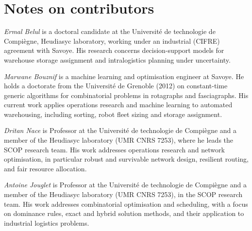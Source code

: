 \documentclass[]{interact}
\begin{document}
\section*{Notes on contributors}
\noindent\textit{Ermal Belul} is a doctoral candidate at the Universit\'{e} de technologie de Compi\`{e}gne, Heudiasyc laboratory, working under an industrial (CIFRE) agreement with Savoye. His research concerns decision-support models for warehouse storage assignment and intralogistics planning under uncertainty.

\medskip
\noindent\textit{Marwane Bouznif} is a machine learning and optimisation engineer at Savoye. He holds a doctorate from the Universit\'{e} de Grenoble (2012) on constant-time generic algorithms for combinatorial problems in rotagraphs and fasciagraphs. His current work applies operations research and machine learning to automated warehousing, including sorting, robot fleet sizing and storage assignment.

\medskip
\noindent\textit{Dritan Nace} is Professor at the Universit\'{e} de technologie de Compi\`{e}gne and a member of the Heudiasyc laboratory (UMR CNRS 7253), where he leads the SCOP research team. His work addresses operations research and network optimisation, in particular robust and survivable network design, resilient routing, and fair resource allocation.

\medskip
\noindent\textit{Antoine Jouglet} is Professor at the Universit\'{e} de technologie de Compi\`{e}gne and a member of the Heudiasyc laboratory (UMR CNRS 7253), in the SCOP research team. His work addresses combinatorial optimisation and scheduling, with a focus on dominance rules, exact and hybrid solution methods, and their application to industrial logistics problems.



\end{document}
